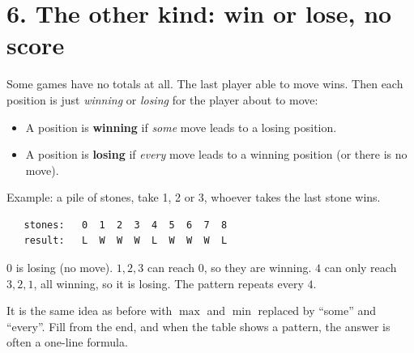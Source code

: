 \documentclass[11pt]{article}
\begin{document}
\section*{6. The other kind: win or lose, no score}

Some games have no totals at all. The last player able to move wins. Then each
position is just \emph{winning} or \emph{losing} for the player about to move:

\begin{itemize}
  \item A position is \textbf{winning} if \emph{some} move leads to a losing position.
  \item A position is \textbf{losing} if \emph{every} move leads to a winning position
        (or there is no move).
\end{itemize}

Example: a pile of stones, take 1, 2 or 3, whoever takes the last stone wins.

\begin{verbatim}
   stones:   0  1  2  3  4  5  6  7  8
   result:   L  W  W  W  L  W  W  W  L
\end{verbatim}

$0$ is losing (no move). $1, 2, 3$ can reach $0$, so they are winning. $4$ can
only reach $3, 2, 1$, all winning, so it is losing. The pattern repeats every $4$.

It is the same idea as before with $\max$ and $\min$ replaced by ``some'' and
``every''. Fill from the end, and when the table shows a pattern, the answer is
often a one-line formula.
\end{document}
